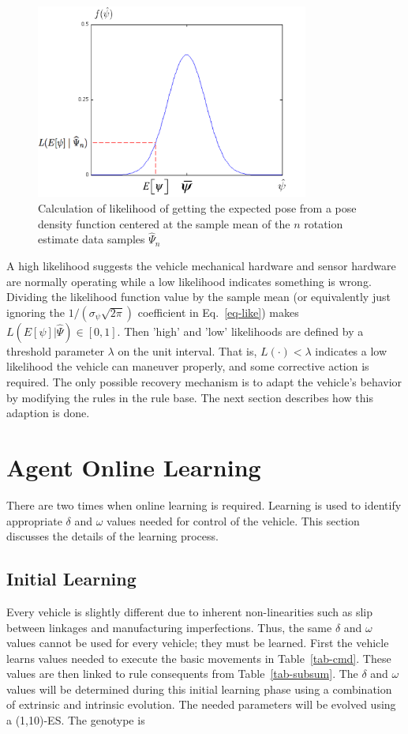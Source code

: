 \begin{figure}
\centering
\includegraphics[width=0.8\textwidth]{Files/Figures/like.png}
\caption[Pose density function]{Calculation of likelihood of getting the expected pose from a pose density function
centered at the sample mean of the $n$ rotation estimate data samples $\hat{\Psi}_n$}
\label{fig_like}
\end{figure}
A high likelihood suggests the vehicle mechanical hardware and sensor hardware are normally operating while a low likelihood indicates something is wrong. Dividing the likelihood function value by the sample mean (or equivalently just ignoring the $1/(\sigma_\psi \sqrt{2\pi})$ coefficient in Eq.~\ref{eq-like}) makes $L ( E[\psi]|\hat{\Psi}) \in [0, 1]$. Then 'high' and 'low' likelihoods are defined by a threshold parameter $\lambda$ on the unit interval. That is, $L (\cdot) < \lambda$ indicates a low likelihood the vehicle can maneuver properly, and some corrective action is required. The only possible recovery mechanism is to adapt the vehicle's behavior by modifying the rules in the rule base. The next section describes how this adaption is done.


\section{Agent Online Learning}
\label{sec-AgentAdaptation}
There are two times when online learning is required. Learning is used to identify appropriate  $\delta$ and $\omega$ values needed for control of the vehicle. This section discusses the details of the learning process.

\subsection{Initial Learning}
\label{subsec-FirstStageAdaptation}
Every vehicle is slightly different due to inherent non-linearities such as slip between linkages and manufacturing imperfections. Thus, the same $\delta$ and $\omega$ values cannot be used for every vehicle; they must be learned. First the vehicle learns values needed to execute the basic movements in Table~\ref{tab-cmd}. These values are then linked to rule consequents from Table~\ref{tab-subsum}. The $\delta$ and $\omega$ values will be determined during this initial learning phase using a combination of extrinsic and intrinsic evolution.
The needed parameters will be evolved using a (1,10)-ES. The genotype is 

